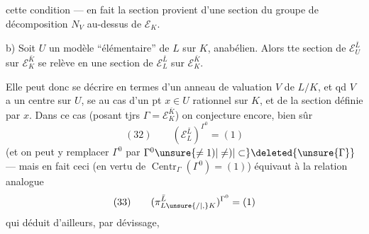  cette condition --- en fait la section provient d'une section du groupe de décomposition $N_V$ au-dessus de $\mathcal E_K$.

\noindent b) Soit $U$ un modèle ``élémentaire'' de $L$ sur $K$, anabélien. Alors tte section de $\mathcal E_U^{\bar L}$ sur $\mathcal E_K^{\bar K}$ se relève en une section de $\mathcal E_L^{\bar L}$ sur $\mathcal E_K^{\bar K}$.

Elle peut donc se décrire en termes d'un anneau de valuation $V$ de $L/K$, et qd $V$ a un centre sur $U$,  se  au cas d'un pt $x\in U$ rationnel sur $K$, et de la section définie par $x$. Dans ce cas (posant tjrs $\Gamma=\mathcal E_K^{\bar K}$) on conjecture encore, bien sûr
\[
(32)\qquad (\mathcal E_L^{\bar L})^{\Gamma^0}=(1)
\]
(et on peut y remplacer $\Gamma^0$ par $\Gamma^0\unsure{\ne1)|\ne)|\subset}\deleted{\unsure{\Gamma}}$
--- mais en fait ceci (en vertu de $\operatorname{Centr}_\Gamma(\Gamma^0)=(1)$) équivaut à la relation analogue 
\[
(33)\qquad (\pi_{L\unsure{/|,}K}^{\bar L})^{\Gamma^0}=(1)
\]
qui  déduit d'ailleurs, par dévissage,
